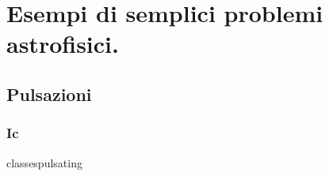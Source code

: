 \documentclass[oneside,12pt,fleqn]{memoir}
\begin{document}


\part{Esempi di semplici problemi astrofisici.}

\chapter{Pulsazioni}
\PartialToc

\section{Ic}

classespulsating


\renewcommand{\listfigurename}{Elenco figure}
 
\renewcommand{\indexname}{Indice}

\listoffigures

\printindex
\end{document}
